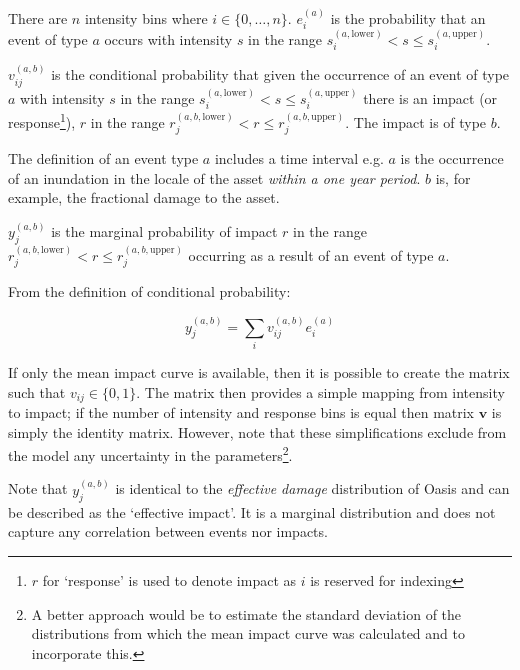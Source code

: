 \documentclass[a4paper,11pt]{extarticle} %
\begin{document}
There are $n$ intensity bins where $i \in \{0, \dots, n \}$. $e^{(a)}_i$ is the probability that an event of type $a$ occurs with intensity $s$ in the range $s^{(a, \text{lower})}_i < s \le s^{(a, \text{upper})}_i$.

$v^{(a, b)}_{ij}$ is the conditional probability that given the occurrence of an event of type $a$ with intensity $s$ in the range $s^{(a, \text{lower})}_i < s \le s^{(a, \text{upper})}_i$ there is an impact (or response\footnote{$r$ for `response' is used to denote impact as $i$ is reserved for indexing}), $r$ in the range $r^{(a,b,\text{lower})}_j < r \le r^{(a,b,\text{upper})}_j$. The impact is of type $b$. 

The definition of an event type $a$ includes a time interval e.g. $a$ is the occurrence of an inundation in the locale of the asset {\it within a one year period}. $b$ is, for example, the fractional damage to the asset.

$y^{(a,b)}_j$ is the marginal probability of impact $r$ in the range $r^{(a,b, \text{lower})}_j < r \le r^{(a,b,\text{upper})}_j$ occurring as a result of an event of type $a$. 

From the definition of conditional probability:

\begin{equation}
	\label{Eq:vulnerability}
	y^{(a,b)}_j = \sum_{i} v^{(a,b)}_{ij} e^{(a)}_i
\end{equation}

If only the mean impact curve is available, then it is possible to create the matrix such that $v_{ij} \in \{0, 1\}$. The matrix then provides a simple mapping from intensity to impact; if the number of intensity and response bins is equal then matrix $\mathbf{v}$ is simply the identity matrix. However, note that these simplifications exclude from the model any uncertainty in the parameters\footnote{A better approach would be to estimate the standard deviation of the distributions from which the mean impact curve was calculated and to incorporate this.}.

Note that $y^{(a,b)}_j$ is identical to the {\it effective damage} distribution of Oasis and can be described as the `effective impact'. It is a marginal distribution and does not capture any correlation between events nor impacts.
\end{document}
